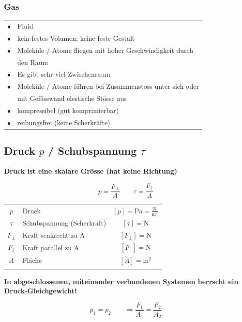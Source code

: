 \subsubsection{Gas}

\begin{tabular}{ll}
	$\bullet$ & Fluid \\
	$\bullet$ & kein festes Volumen; keine feste Gestalt \\
	$\bullet$ & Moleküle / Atome fliegen mit hoher Geschwindigkeit durch\\
			  & den Raum \\
	$\bullet$ & Es gibt sehr viel Zwischenraum \\
	$\bullet$ &  Moleküle / Atome führen bei Zusammenstoss unter sich oder\\
			  & mit Gefässwand elestische Stösse aus \\
	$\bullet$ & kompressibel (gut komprimierbar)  \\
	$\bullet$ & reibungsfrei (keine Scherkräfte)\\

\end{tabular}


\vfill\null
\columnbreak


\subsection{Druck $p$ / Schubspannung $\tau$}
\textbf{Druck ist eine skalare Grösse (hat keine Richtung)} 


$$\boxed{ p = \frac{F_{\perp}}{A} } \qquad \boxed{ \tau = \frac{F_{\parallel}}{A} } $$

	\begin{tabular}{c l c}
		$p$ & Druck & $[p] = \mathrm{Pa = \frac{N}{m^2}}$ \\
		$\tau$ & Schubspannung (Scherkraft) & $[\tau] = \mathrm{N} $ \\
		$F_{\perp}$ & Kraft senkrecht zu A & $[F_{\perp}] = \mathrm{N}$ \\
		$F_{\parallel}$ & Kraft parallel zu A & $[F_{\parallel}] = \mathrm{N}$ \\
		$A$ & Fläche & $[A] = \mathrm{m^2}$ \\
		\\
	\end{tabular}
	
	\textbf{In abgeschlossenen, miteinander verbundenen Systemen herrscht ein Druck-Gleichgewicht!} 
	
	$$ \boxed{ p_1 = p_2  \qquad \Rightarrow \frac{F_1}{A_1} = \frac{F_2}{A_2} }$$
	
